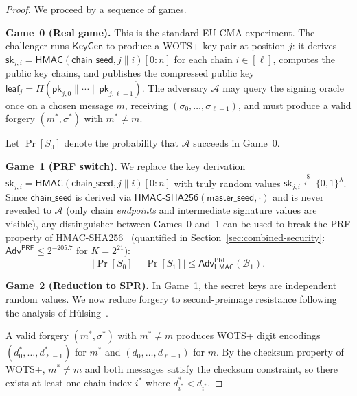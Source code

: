 \documentclass[11pt,a4paper]{article}
\theoremstyle{definition}
\begin{document}
\begin{proof}
We proceed by a sequence of games.

\medskip\noindent\textbf{Game~0 (Real game).} This is the standard EU-CMA experiment. The challenger runs $\mathsf{KeyGen}$ to produce a WOTS+ key pair at position $j$: it derives $\mathsf{sk}_{j,i} = \mathsf{HMAC}(\mathsf{chain\_seed}, j \| i)[0{:}n]$ for each chain $i \in [\ell]$, computes the public key chains, and publishes the compressed public key $\mathsf{leaf}_j = H(\mathsf{pk}_{j,0} \| \cdots \| \mathsf{pk}_{j,\ell-1})$. The adversary $\mathcal{A}$ may query the signing oracle once on a chosen message $m$, receiving $(\sigma_0, \ldots, \sigma_{\ell-1})$, and must produce a valid forgery $(m^*, \sigma^*)$ with $m^* \neq m$.

Let $\Pr[S_0]$ denote the probability that $\mathcal{A}$ succeeds in Game~0.

\medskip\noindent\textbf{Game~1 (PRF switch).} We replace the key derivation $\mathsf{sk}_{j,i} = \mathsf{HMAC}(\mathsf{chain\_seed}, j \| i)[0{:}n]$ with truly random values $\mathsf{sk}_{j,i} \xleftarrow{\$} \{0,1\}^{\lambda}$. Since $\mathsf{chain\_seed}$ is derived via $\mathsf{HMAC\text{-}SHA256}(\mathsf{master\_seed}, \cdot)$ and is never revealed to $\mathcal{A}$ (only chain \emph{endpoints} and intermediate signature values are visible), any distinguisher between Games~0 and~1 can be used to break the PRF property of HMAC-SHA256~\cite{rfc2104} (quantified in Section~\ref{sec:combined-security}: $\mathsf{Adv}^{\mathsf{PRF}} \leq 2^{-205.7}$ for $K = 2^{21}$):
$$
|\Pr[S_0] - \Pr[S_1]| \leq \mathsf{Adv}^{\mathsf{PRF}}_{\mathsf{HMAC}}(\mathcal{B}_1).
$$

\medskip\noindent\textbf{Game~2 (Reduction to SPR).} In Game~1, the secret keys are independent random values. We now reduce forgery to second-preimage resistance following the analysis of H\"ulsing~\cite{hulsing2013wots}.

A valid forgery $(m^*, \sigma^*)$ with $m^* \neq m$ produces WOTS+ digit encodings $(d^*_0, \ldots, d^*_{\ell-1})$ for $m^*$ and $(d_0, \ldots, d_{\ell-1})$ for $m$. By the checksum property of WOTS+, $m^* \neq m$ and both messages satisfy the checksum constraint, so there exists at least one chain index $i^*$ where $d^*_{i^*} < d_{i^*}$.


\end{proof}
\end{document}

